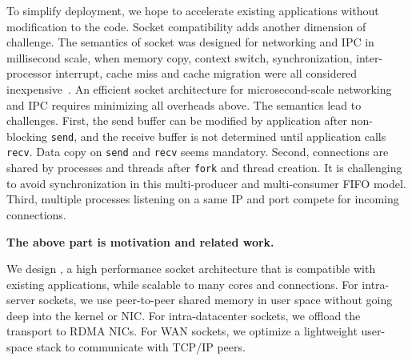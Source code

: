 

To simplify deployment, we hope to accelerate existing applications without modification to the code. Socket compatibility adds another dimension of challenge. The semantics of socket was designed for networking and IPC in millisecond scale, when memory copy, context switch, synchronization, inter-processor interrupt, cache miss and cache migration were all considered inexpensive~\cite{barroso2017attack}. An efficient socket architecture for microsecond-scale networking and IPC requires minimizing all overheads above. The semantics lead to challenges. First, the send buffer can be modified by application after non-blocking \texttt{send}, and the receive buffer is not determined until application calls \texttt{recv}. Data copy on \texttt{send} and \texttt{recv} seems mandatory. Second, connections are shared by processes and threads after \texttt{fork} and thread creation. It is challenging to avoid synchronization in this multi-producer and multi-consumer FIFO model. Third, multiple processes listening on a same IP and port compete for incoming connections.

\textbf{The above part is motivation and related work.}

We design \sys{}, a high performance socket architecture that is compatible with existing applications, while scalable to many cores and connections. For intra-server sockets, we use peer-to-peer shared memory in user space without going deep into the kernel or NIC. For intra-datacenter sockets, we offload the transport to RDMA NICs. For WAN sockets, we optimize a lightweight user-space stack to communicate with TCP/IP peers.



